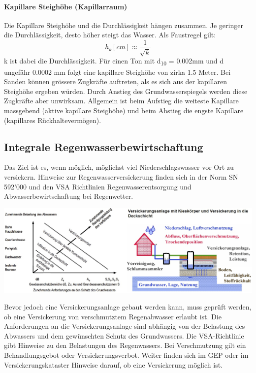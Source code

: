 \documentclass[9pt, openright=false]{scrartcl}
\begin{document}
\paragraph{Kapillare Steighöhe (Kapillarraum)} Die Kapillare Steighöhe und die Durchlässigkeit hängen zusammen. Je geringer die Durchlässigkeit, desto höher steigt das Wasser. Als Faustregel gilt: \[h_k[cm] \approx\dfrac{1}{\sqrt{k}}\] k ist dabei die Durchlässigkeit. Für einen Ton mit d\textsubscript{10} = 0.002mm und d ungefähr 0.0002 mm folgt eine kapillare Steighöhe von zirka 1.5 Meter. Bei Sanden können grössere Zugkräfte auftreten, als es sich aus der kapillaren Steighöhe ergeben würden. Durch Anstieg des Grundwasserspiegels werden diese Zugkräfte aber unwirksam. Allgemein ist beim Aufstieg die weiteste Kapillare massgebend (aktive kapillare Steighöhe) und beim Abstieg die engste Kapillare (kapillares Rückhaltevermögen).
\subsection{Integrale Regenwasserbewirtschaftung}
Das Ziel ist es, wenn möglich, möglichst viel Niederschlagswasser vor Ort zu versickern. Hinweise zur Regenwasserversickerung finden sich in der Norm SN 592'000 und den VSA Richtlinien Regenwasserentsorgung und Abwasserbewirtschaftung bei Regenwetter. 
\begin{center}
\includegraphics[width=.8\textwidth]{images/versickerungbelastung}
\end{center}
Bevor jedoch eine Versickerungsanlage gebaut werden kann, muss geprüft werden, ob eine Versickerung von verschmutztem Regenabwasser erlaubt ist. Die Anforderungen an die Versickerungsanlage sind abhängig von der Belastung des Abwassers und dem gewünschten Schutz des Grundwassers. Die VSA-Richtlinie gibt Hinweise zu den Belastungen des Regenwassers. Bei Verschmutzung gilt ein Behandlungsgebot oder Versickerungsverbot. Weiter finden sich im GEP oder im Versickerungskataster Hinweise darauf, ob eine Versickerung möglich ist.
\end{document}
